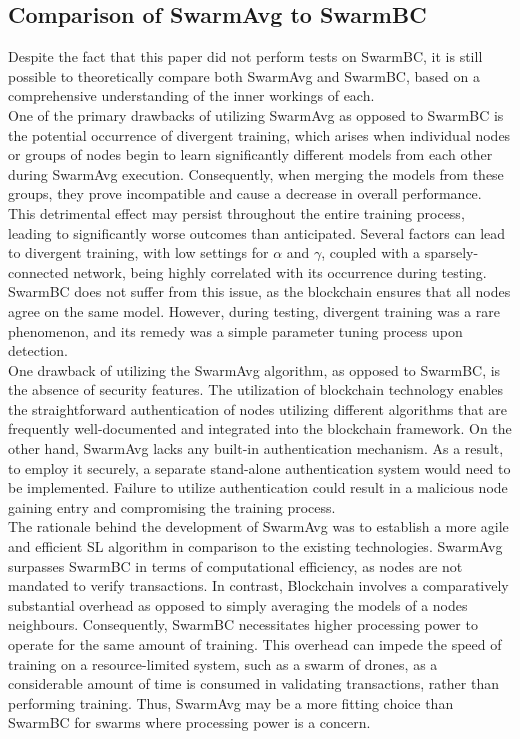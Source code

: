 \subsection{Comparison of SwarmAvg to SwarmBC}
Despite the fact that this paper did not perform tests on SwarmBC, it is still possible to theoretically compare both SwarmAvg and SwarmBC, based on a comprehensive understanding of the inner workings of each. \\

One of the primary drawbacks of utilizing SwarmAvg as opposed to SwarmBC is the potential occurrence of divergent training, which arises when individual nodes or groups of nodes begin to learn significantly different models from each other during SwarmAvg execution. Consequently, when merging the models from these groups, they prove incompatible and cause a decrease in overall performance. This detrimental effect may persist throughout the entire training process, leading to significantly worse outcomes than anticipated. Several factors can lead to divergent training, with low settings for $\alpha$ and $\gamma$, coupled with a sparsely-connected network, being highly correlated with its occurrence during testing. SwarmBC does not suffer from this issue, as the blockchain ensures that all nodes agree on the same model. However, during testing, divergent training was a rare phenomenon, and its remedy was a simple parameter tuning process upon detection. \\

One drawback of utilizing the SwarmAvg algorithm, as opposed to SwarmBC, is the absence of security features. The utilization of blockchain technology enables the straightforward authentication of nodes utilizing different algorithms that are frequently well-documented and integrated into the blockchain framework. On the other hand, SwarmAvg lacks any built-in authentication mechanism. As a result, to employ it securely, a separate stand-alone authentication system would need to be implemented. Failure to utilize authentication could result in a malicious node gaining entry and compromising the training process. \\

The rationale behind the development of SwarmAvg was to establish a more agile and efficient SL algorithm in comparison to the existing technologies. SwarmAvg surpasses SwarmBC in terms of computational efficiency, as nodes are not mandated to verify transactions. In contrast, Blockchain involves a comparatively substantial overhead as opposed to simply averaging the models of a nodes neighbours. Consequently, SwarmBC necessitates higher processing power to operate for the same amount of training. This overhead can impede the speed of training on a resource-limited system, such as a swarm of drones, as a considerable amount of time is consumed in validating transactions, rather than performing training. Thus, SwarmAvg may be a more fitting choice than SwarmBC for swarms where processing power is a concern.

